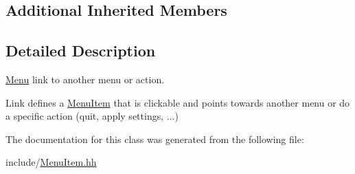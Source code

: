 \subsection*{Additional Inherited Members}


\subsection{Detailed Description}
\hyperlink{classMenu}{Menu} link to another menu or action. 

Link defines a \hyperlink{classMenuItem}{Menu\+Item} that is clickable and points towards another menu or do a specific action (quit, apply settings, ...) 

The documentation for this class was generated from the following file\+:\begin{DoxyCompactItemize}
\item 
include/\hyperlink{MenuItem_8hh}{Menu\+Item.\+hh}\end{DoxyCompactItemize}
